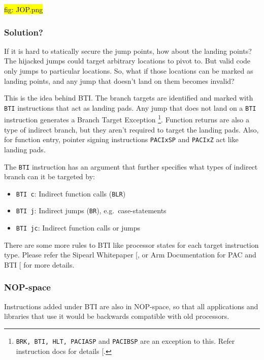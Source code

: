 \documentclass[a4paper, nobind]{templates/ociamthesis}
\providecommand{\tightlist}{%
  \setlength{\itemsep}{0pt}\setlength{\parskip}{0pt}}
\begin{document}
\hl{fig: JOP.png}

\subsubsection{Solution?}\label{solution-1}

If it is hard to statically secure the jump points, how about the landing points?
The hijacked jumps could target arbitrary locations to pivot to.
But valid code only jumps to particular locations. So, what if those locations
can be marked as landing points, and any jump that doesn't land on them becomes invalid?

This is the idea behind BTI. The branch targets are identified and marked with \texttt{BTI}
instructions that act as landing pads. Any jump that does not land on a \texttt{BTI} instruction
generates a Branch Target Exception \footnote{\texttt{BRK,\ BTI,\ HLT,\ PACIASP} and \texttt{PACIBSP} are an exception to this.
  Refer instruction docs for details {[}\citeproc{ref-armasm-user-guide}{8}{]}.}.
Function returns are also a type of indirect branch, but they aren't required
to target the landing pads. Also, for function entry,
pointer signing instructions \texttt{PACIxSP} and \texttt{PACIxZ} act like landing pads.

The \texttt{BTI} instruction has an argument that further specifies what types of indirect branch can it be targeted by:

\begin{itemize}
\tightlist
\item
  \texttt{BTI\ c}: Indirect function calls (\texttt{BLR})
\item
  \texttt{BTI\ j}: Indirect jumps (\texttt{BR}), e.g.~case-statements
\item
  \texttt{BTI\ jc}: Indirect function calls or jumps
\end{itemize}

There are some more rules to BTI like processor states for each target instruction type.
Please refer the Sipearl Whitepaper {[}\citeproc{ref-sipearl}{51}{]}, or Arm Documentation for PAC and BTI {[}\citeproc{ref-arm-pacbti}{9}{]} for more details.

\subsubsection{NOP-space}\label{nop-space}

Instructions added under BTI are also in NOP-space, so that all applications and
libraries that use it would be backwards compatible with old processors.
\end{document}
